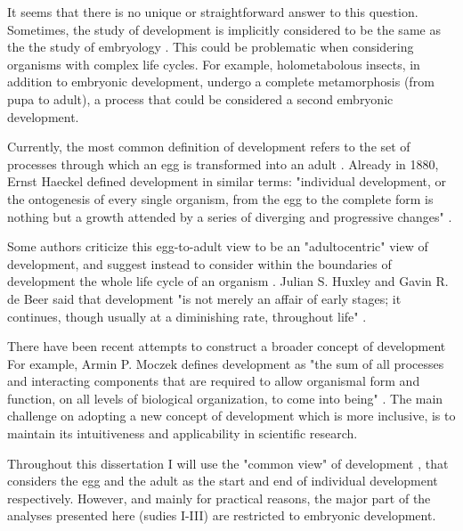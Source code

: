 It seems that there is no unique or straightforward answer to this question.
Sometimes, the study of development is implicitly considered to be the same as the the study of embryology \citep{Horder2010}.
This could be problematic when considering organisms with complex life cycles. For example, holometabolous insects, in addition to embryonic development, undergo a complete metamorphosis (from pupa to adult), a process that could be considered a second embryonic development.

Currently, the most common definition of development refers to the set of processes through which an egg is transformed into an adult \citep{Horder2010,Minelli2011}.
Already in 1880, Ernst Haeckel defined development in similar terms: "individual development, or the ontogenesis of every single organism, from the egg to the complete form is nothing but a growth attended by a series of diverging and progressive changes" \citep{haeckel_historycreation1880}.

Some authors criticize this egg-to-adult view to be an "adultocentric" view of development, and suggest instead to consider within the boundaries of development the whole life cycle of an organism \citep{Gilbert2011,Minelli2011}.
Julian S. Huxley and Gavin R. de Beer said that development "is not merely an affair of early stages; it continues, though usually at a diminishing rate, throughout life" \citep{huxley1963elements}.


There have been recent attempts to construct a broader concept of development \citep{Griesemer2014,Moczek2014,Pradeu2014} For example, Armin P. Moczek defines development as "the sum of all processes and interacting components that are required to allow organismal form and function, on all levels of biological organization, to come into being" \citep{Moczek2014}.
%
The main challenge on adopting a new concept of development which is more inclusive, is to maintain its intuitiveness and applicability in scientific research.

Throughout this dissertation I will use the "common view" of development \citep{Minelli2014}, that considers the egg and the adult as the start and end of individual development respectively.
However, and mainly for practical reasons, the major part of the analyses presented here (sudies I-III) are restricted to embryonic development.
